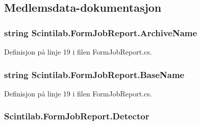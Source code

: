 \subsection{Medlemsdata-\/dokumentasjon}
\hypertarget{class_scintilab_1_1_form_job_report_a6befd8e22fc03d7db559bc5819b9001a}{
\subsubsection[{Archive\+Name}]{\setlength{\rightskip}{0pt plus 5cm}string Scintilab.\+Form\+Job\+Report.\+Archive\+Name\hspace{0.3cm}{\ttfamily [private]}}}\label{class_scintilab_1_1_form_job_report_a6befd8e22fc03d7db559bc5819b9001a}


Definisjon på linje 19 i filen Form\+Job\+Report.\+cs.

\hypertarget{class_scintilab_1_1_form_job_report_ae2edaad73f9347d9cbc70299ea55c8e4}{
\subsubsection[{Base\+Name}]{\setlength{\rightskip}{0pt plus 5cm}string Scintilab.\+Form\+Job\+Report.\+Base\+Name\hspace{0.3cm}{\ttfamily [private]}}}\label{class_scintilab_1_1_form_job_report_ae2edaad73f9347d9cbc70299ea55c8e4}


Definisjon på linje 19 i filen Form\+Job\+Report.\+cs.

\hypertarget{class_scintilab_1_1_form_job_report_acfd377f5214f1677dbfcee75e848fd3e}{
\subsubsection[{Detector}]{ Scintilab.\+Form\+Job\+Report.\+Detector\hspace{0.3cm}{\ttfamily [private]}}}\label{class_scintilab_1_1_form_job_report_acfd377f5214f1677dbfcee75e848fd3e}



